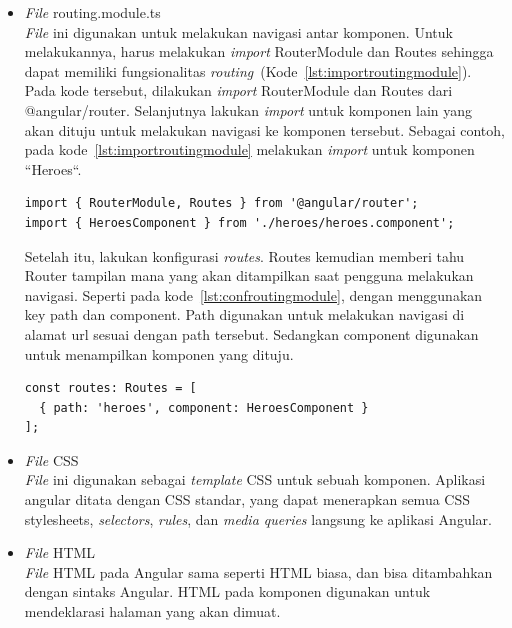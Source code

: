 \begin{itemize}
	\item \textit{File} routing.module.ts \\
		\textit{File} ini digunakan untuk melakukan navigasi antar komponen. Untuk melakukannya, harus melakukan \textit{import} RouterModule dan Routes sehingga dapat memiliki fungsionalitas \textit{routing}~(Kode~\ref{lst:importroutingmodule}). Pada kode tersebut, dilakukan \textit{import} RouterModule dan Routes dari @angular/router. Selanjutnya lakukan \textit{import} untuk komponen lain yang akan dituju untuk melakukan navigasi ke komponen tersebut. Sebagai contoh, pada kode~\ref{lst:importroutingmodule} melakukan \textit{import} untuk komponen ``Heroes``.

\begin{lstlisting}[label={lst:importroutingmodule}, caption=Contoh \textit{import} pada routing.module.ts, captionpos=b]
import { RouterModule, Routes } from '@angular/router';
import { HeroesComponent } from './heroes/heroes.component';
\end{lstlisting} 

		Setelah itu, lakukan konfigurasi \textit{routes}. Routes kemudian memberi tahu Router tampilan mana yang akan ditampilkan saat pengguna melakukan navigasi. Seperti pada kode~\ref{lst:confroutingmodule}, dengan menggunakan key path dan component. Path digunakan untuk melakukan navigasi di alamat url sesuai dengan path tersebut. Sedangkan component digunakan untuk menampilkan komponen yang dituju.
		
\begin{lstlisting}[label={lst:confroutingmodule}, caption=Contoh Konfigurasi \textit{Routes} pada routing.module.ts, captionpos=b]
const routes: Routes = [
  { path: 'heroes', component: HeroesComponent }
];
\end{lstlisting} 

	\item \textit{File} CSS \\
		\textit{File} ini digunakan sebagai \textit{template} CSS untuk sebuah komponen. Aplikasi angular ditata dengan CSS standar, yang dapat menerapkan  semua CSS stylesheets, \textit{selectors}, \textit{rules}, dan \textit{media queries} langsung ke aplikasi Angular.
		 
	\item \textit{File} HTML \\
		\textit{File} HTML pada Angular sama seperti HTML biasa, dan bisa ditambahkan dengan sintaks Angular. HTML pada komponen digunakan untuk mendeklarasi halaman yang akan dimuat.
		

\end{itemize}
